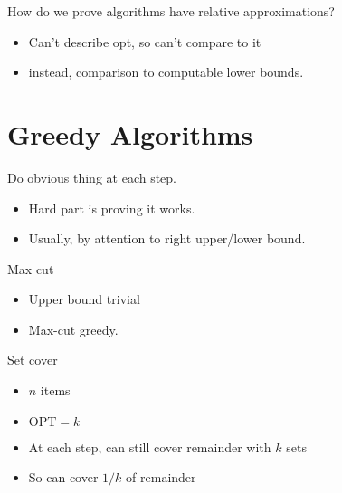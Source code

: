\documentclass{article}
\begin{document}
How do we prove algorithms have relative approximations?  
\begin{itemize}
\item Can't describe opt, so can't compare to it
\item instead, comparison to computable lower bounds.
\end{itemize}

\section*{Greedy Algorithms}
\def\OPT{{\mbox{OPT}}}


Do obvious thing at each step.
\begin{itemize}
\item Hard part is proving it works.
\item Usually, by attention to right upper/lower bound.
\end{itemize}

Max cut
\begin{itemize}
\item Upper bound trivial
\item Max-cut greedy.
\end{itemize}

\iffalse
this is homework!
Min-diameter clustering?
\begin{itemize}
\item Gonzales' algorithm.
\item Distances to existing centers keep dropping
\item Suppose after $k$ chosen, farthest remaining is distance $d$
\item Then $\OPT \ge d$
\begin{itemize}
\item  $k+1$ mutually-distance-$d$ points
\item some must  share a cluster
\end{itemize}
\item Now assign each point to closest center
\item Max distance from center (radius) is $d$
\item So max diameter is $2d$
\item 2-approx.
\end{itemize}
\fi

Set cover
\begin{itemize}
\item $n$ items
\item $\OPT=k$
\item At each step, can still cover remainder with $k$ sets
\item So can cover $1/k$ of remainder
\end{itemize}
\end{document}
